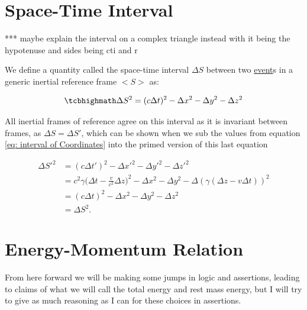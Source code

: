 \section{Space-Time Interval}

*** maybe explain the interval on a complex triangle instead with it being the hypotenuse and sides being cti and r

We define a quantity called the space-time interval $\Delta S$ between two \hyperlink{def-event}{event}s in a generic inertial reference frame $<\!\!S\!>$ as:

\begin{equation}
	\mhl{
		\Delta S^2 = (c\Delta t)^2 -\Delta x^2 -\Delta y^2 -\Delta z^2
	}
	\label{eq: space-time interval}
\end{equation}

All inertial frames of reference agree on this interval as it is invariant between frames, as $\Delta S=\Delta S'$, which can be shown when we sub the values from equation \eqref{eq: interval of Coordinates} into the primed version of this last equation

\begin{equation}
	\begin{aligned}
		\Delta S'^2 & = (c\Delta t')^2 -\Delta x'^2 -\Delta y'^2 -\Delta z'^2                                                                            \\
		            & = c^2{\gamma} \bigg( \Delta t-\frac{v}{c^2} \Delta z \bigg)^2 -\Delta x^2 -\Delta y^2 -\Delta ({\gamma} ( \Delta z-v \Delta t) )^2 \\
		            & = (c\Delta t)^2 -\Delta x^2 -\Delta y^2 -\Delta z^2                                                                                \\
		            & = \Delta S^2.
	\end{aligned}
\end{equation}

\section{Energy-Momentum Relation}

From here forward we will be making some jumps in logic and assertions, leading to claims of what we will call the total energy and rest mass energy, but I will try to give as much reasoning as I can for these choices in assertions.

